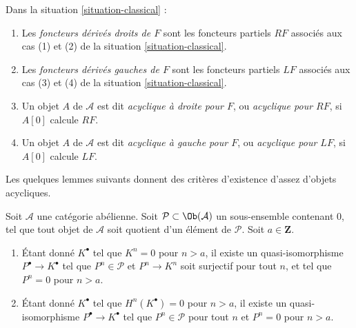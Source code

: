 \begin{definition}
\label{definition-derived-functor}
Dans la situation \ref{situation-classical} :
\begin{enumerate}
\item Les {\it foncteurs dérivés droits de $F$} sont les foncteurs partiels
$RF$ associés aux cas (1) et (2) de la situation \ref{situation-classical}.
\item Les {\it foncteurs dérivés gauches de $F$} sont les foncteurs partiels
$LF$ associés aux cas (3) et (4) de la situation \ref{situation-classical}.
\item Un objet $A$ de $\mathcal{A}$ est dit {\it acyclique à droite pour $F$},
ou {\it acyclique pour $RF$}, si $A[0]$ calcule $RF$.
\item Un objet $A$ de $\mathcal{A}$ est dit {\it acyclique à gauche pour $F$},
ou {\it acyclique pour $LF$}, si $A[0]$ calcule $LF$.
\end{enumerate}
\end{definition}

\noindent
Les quelques lemmes suivants donnent des critères d'existence d'assez d'objets
acycliques.

\begin{lemma}
\label{lemma-subcategory-left-resolution}
Soit $\mathcal{A}$ une catégorie abélienne. Soit
$\mathcal{P} \subset \Ob(\mathcal{A})$ un sous-ensemble contenant $0$, tel
que tout objet de $\mathcal{A}$ soit quotient d'un élément de $\mathcal{P}$.
Soit $a \in \mathbf{Z}$.
\begin{enumerate}
\item Étant donné $K^\bullet$ tel que $K^n = 0$ pour $n > a$, il existe un
quasi-isomorphisme $P^\bullet \to K^\bullet$ tel que
$P^n \in \mathcal{P}$ et $P^n \to K^n$ soit surjectif pour tout $n$, et tel
que $P^n = 0$ pour $n > a$.
\item Étant donné $K^\bullet$ tel que $H^n(K^\bullet) = 0$ pour $n > a$, il
existe un quasi-isomorphisme $P^\bullet \to K^\bullet$ tel que
$P^n \in \mathcal{P}$ pour tout $n$ et $P^n = 0$ pour $n > a$.
\end{enumerate}
\end{lemma}

